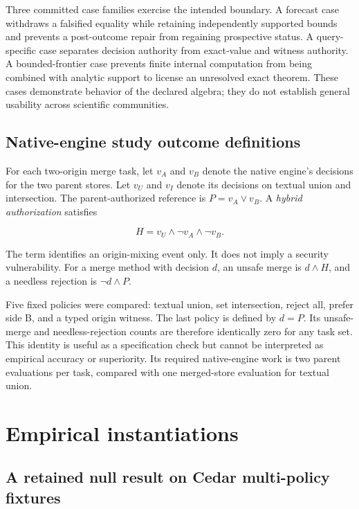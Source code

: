 \documentclass[pdflatex,sn-mathphys-num]{sn-jnl}
\begin{document}
Three committed case families exercise the intended boundary. A forecast case withdraws a falsified equality while retaining independently supported bounds and prevents a post-outcome repair from regaining prospective status. A query-specific case separates decision authority from exact-value and witness authority. A bounded-frontier case prevents finite internal computation from being combined with analytic support to license an unresolved exact theorem. These cases demonstrate behavior of the declared algebra; they do not establish general usability across scientific communities.

\subsection{Native-engine study outcome definitions}\label{native-engine-study-outcome-definitions}

For each two-origin merge task, let \(v_A\) and \(v_B\) denote the native engine's decisions for the two parent stores. Let \(v_U\) and \(v_I\) denote its decisions on textual union and intersection. The parent-authorized reference is \(P=v_A\lor v_B\). A \emph{hybrid authorization} satisfies

\[
H=v_U\land\neg v_A\land\neg v_B.
\]

The term identifies an origin-mixing event only. It does not imply a security vulnerability. For a merge method with decision \(d\), an unsafe merge is \(d\land H\), and a needless rejection is \(\neg d\land P\).

Five fixed policies were compared: textual union, set intersection, reject all, prefer side B, and a typed origin witness. The last policy is defined by \(d=P\). Its unsafe-merge and needless-rejection counts are therefore identically zero for any task set. This identity is useful as a specification check but cannot be interpreted as empirical accuracy or superiority. Its required native-engine work is two parent evaluations per task, compared with one merged-store evaluation for textual union.

\section{Empirical instantiations}\label{empirical-instantiations}

\subsection{A retained null result on Cedar multi-policy fixtures}\label{a-retained-null-result-on-cedar-multi-policy-fixtures}
\end{document}
